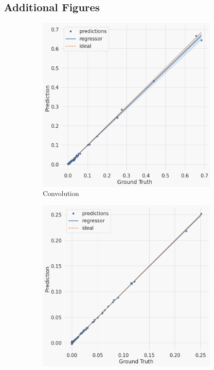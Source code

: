 \subsection{Additional Figures}
\begin{figure}[h]
        \centering
        \begin{subfigure}[b]{0.47\textwidth}
            \centering
            \includegraphics[width=\textwidth]{resources/scatter-conv.png}
            \caption[]%
            {{\small Convolution}}    
            \label{fig:layer-scatterplots convolution}
        \end{subfigure}
        \hfill
        \begin{subfigure}[b]{0.47\textwidth}  
            \centering 
            \includegraphics[width=\textwidth]{resources/scatter-maxpooling.png}

\end{subfigure}
\end{figure}

